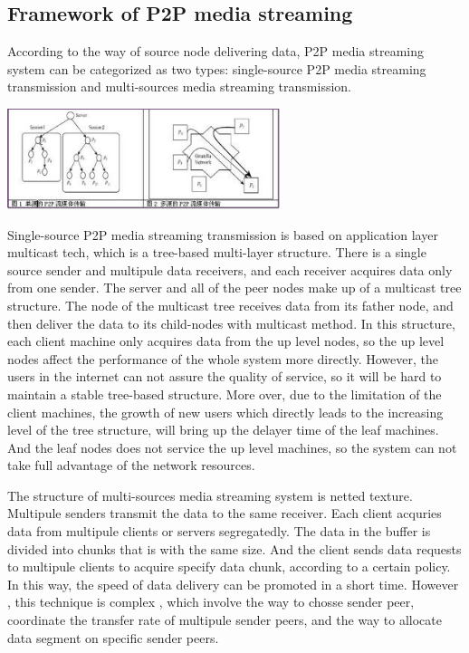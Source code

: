 \subsection{Framework of P2P media streaming}
{
According to the way of source node delivering data, P2P media streaming system can be categorized as two types: single-source P2P media streaming transmission and multi-sources media streaming transmission. 

\includegraphics[width=8cm]{data/P2Pframework.png}

Single-source P2P media streaming transmission is based on application layer multicast tech, which is a tree-based multi-layer structure. 
There is a single source sender and multipule data receivers, and each receiver acquires data only from one sender. The server and all of the peer nodes make up of a multicast tree structure. 
The node of the multicast tree receives data from its father node, and then deliver the data to its child-nodes with multicast method. 
In this structure, each client machine only acquires data from the up level nodes, so the up level nodes affect the performance of the whole system more directly. 
However, the users in the internet can not assure the quality of service, so it will be hard to maintain a stable tree-based structure. 
More over, due to the limitation of the client machines, the growth of new users which directly leads to the increasing level of the tree structure, will bring up the delayer time of the leaf machines. And the leaf nodes does not service the up level machines, so the  system can not take full advantage of the network resources.

The structure of multi-sources media streaming system is netted texture. Multipule senders transmit the data to the same receiver. Each client acquries data from multipule clients or servers segregatedly. 
The data in the buffer is divided into chunks that is with the same size. And the client sends data requests to multipule clients to acquire specify data chunk, according to a certain policy. 
In this way, the speed of data delivery can be promoted in a short time. However , this technique is complex , which involve the way to chosse sender peer, coordinate the transfer rate of multipule sender peers, and the way to allocate data segment on specific sender peers.
}


